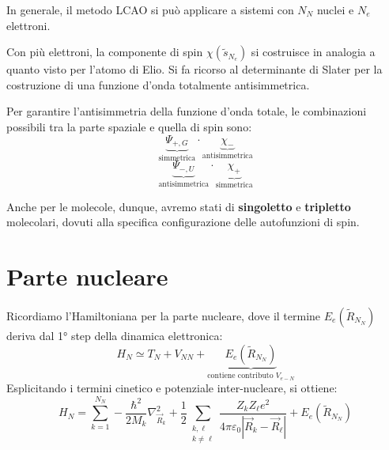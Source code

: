 In generale, il metodo LCAO si può applicare a sistemi con \( N_N \) nuclei e \( N_e \) elettroni.

Con più elettroni, la componente di spin \( \chi(\tilde{s}_{N_e}) \) si costruisce in analogia a quanto visto per l'atomo di Elio. Si fa ricorso al determinante di Slater per la costruzione di una funzione d'onda totalmente antisimmetrica.

\begin{example}[molecola \( H_2 \)]

Per garantire l'antisimmetria della funzione d'onda totale, le combinazioni possibili tra la parte spaziale e quella di spin sono:
\begin{equation}
    \underbrace{\Psi_{+, G}}_{\text{simmetrica}} \cdot \underbrace{\chi_-}_{\text{antisimmetrica}}
\end{equation}
\begin{equation}
    \underbrace{\Psi_{-, U}}_{\text{antisimmetrica}} \cdot \underbrace{\chi_+}_{\text{simmetrica}}
\end{equation}

Anche per le molecole, dunque, avremo stati di \textbf{singoletto} e \textbf{tripletto} molecolari, dovuti alla specifica configurazione delle autofunzioni di spin.
\end{example}

\section{Parte nucleare}

Ricordiamo l'Hamiltoniana per la parte nucleare, dove il termine \( E_e(\tilde{R}_{N_N}) \) deriva dal 1° step della dinamica elettronica:
\begin{equation}
    H_N \simeq T_N + V_{NN} + \underbrace{E_e(\tilde{R}_{N_N})}_{\text{contiene contributo } V_{e-N}}
\end{equation}
Esplicitando i termini cinetico e potenziale inter-nucleare, si ottiene:
\begin{equation}
    H_N = \sum_{k=1}^{N_N} -\frac{\hbar^2}{2M_k} \nabla_{\vec{R}_k}^2 + \frac{1}{2} \sum_{\substack{k,\ell \\ k \neq \ell}} \frac{Z_k Z_\ell e^2}{4\pi\varepsilon_0 |\vec{R}_k - \vec{R}_\ell|} + E_e(\tilde{R}_{N_N})
\end{equation}

